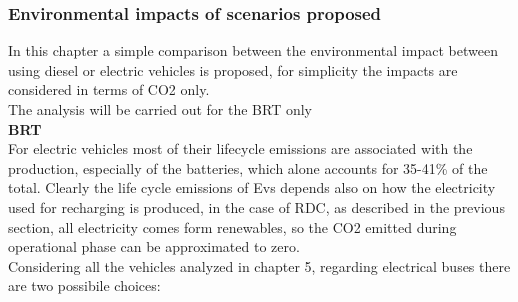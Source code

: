 \documentclass{article}
\begin{document}
\subsubsection{Environmental impacts of scenarios proposed}
In this chapter a simple comparison between the environmental impact between using diesel or electric vehicles is proposed, for simplicity the impacts are considered in terms of CO2 only.\\
The analysis will be carried out for the BRT only\\

\textbf{BRT}\\
For electric vehicles most of their lifecycle emissions are associated with the production, especially of the batteries, which alone accounts for 35-41\% of the total.\cite{40} Clearly the life cycle emissions of Evs depends also on how the electricity used for recharging is produced, in the case of RDC, as described in the previous section, all electricity comes form renewables, so the CO2 emitted during operational phase can be approximated to zero.\\
Considering all the vehicles analyzed in chapter 5, regarding electrical buses there are two possibile choices:
\end{document}
